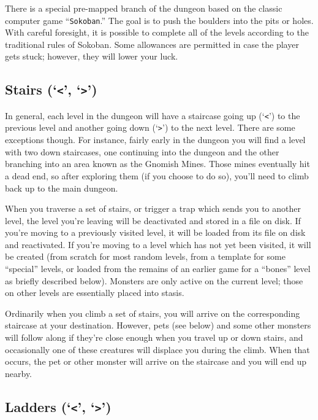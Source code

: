 There is a special pre-mapped branch of the dungeon based on the
classic computer game ``{\tt Sokoban}.''  The goal is to push the boulders
into the pits or holes.  With careful foresight, it is possible to
complete all of the levels according to the traditional rules of
Sokoban.  Some allowances are permitted in case the player gets stuck;
however, they will lower your luck.

\subsection*{Stairs (`{\tt <}', `{\tt >}')}

In general, each level in the dungeon will have a staircase going up
(`{\tt <}') to the previous level and another going down (`{\tt >}')
to the next
level.  There are some exceptions though.  For instance, fairly early
in the dungeon you will find a level with two down staircases, one
continuing into the dungeon and the other branching into an area
known as the Gnomish Mines.  Those mines eventually hit a dead end,
so after exploring them (if you choose to do so), you'll need to
climb back up to the main dungeon.

When you traverse a set of stairs, or trigger a trap which sends you
to another level, the level you're leaving will be deactivated and
stored in a file on disk.  If you're moving to a previously visited
level, it will be loaded from its file on disk and reactivated.  If
you're moving to a level which has not yet been visited, it will be
created (from scratch for most random levels, from a template for
some ``special'' levels, or loaded from the remains of an earlier game
for a ``bones'' level as briefly described below).  Monsters are only
active on the current level; those on other levels are essentially
placed into stasis.
 
Ordinarily when you climb a set of stairs, you will arrive on the
corresponding staircase at your destination.  However, pets (see below)
and some other monsters will follow along if they're close enough when
you travel up or down stairs, and occasionally one of these creatures
will displace you during the climb.  When that occurs, the pet or other
monster will arrive on the staircase and you will end up nearby.

\subsection*{Ladders (`{\tt <}', `{\tt >}')}

